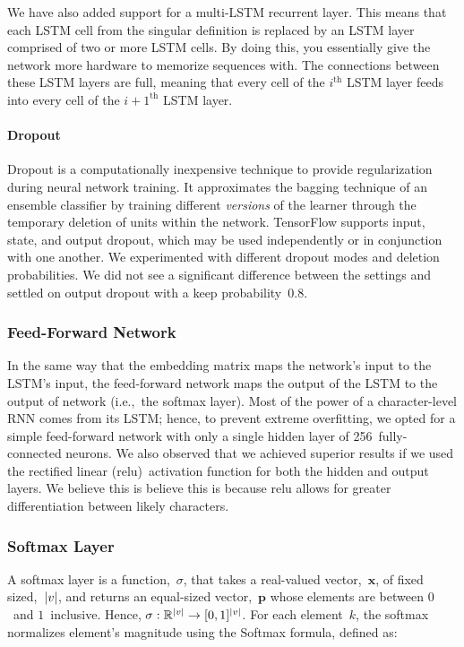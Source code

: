 \documentclass{article}
\DeclarePairedDelimiter\abs{\lvert}{\rvert}%
\begin{document}
We have also added support for a multi-LSTM recurrent layer. This means that each LSTM cell from the singular definition is replaced by an LSTM layer comprised of two or more LSTM cells. By doing this, you essentially give the network more hardware to memorize sequences with. The connections between these LSTM layers are full, meaning that every cell of the $i^{\text{th}}$ LSTM layer feeds into every cell of the $i+1^{\text{th}}$ LSTM layer.

\paragraph{Dropout}\label{sec:dropout}

Dropout is a computationally inexpensive technique to provide regularization during neural network training.  It approximates the bagging technique of an ensemble classifier by training different \textit{versions} of the learner through the temporary deletion of units within the network.\cite{goodfellow2016}  TensorFlow supports input, state, and output dropout, which may be used independently or in conjunction with one another.  We experimented with different dropout modes and deletion probabilities.  We did not see a significant difference between the settings and settled on output dropout with a keep probability~0.8.

\subsubsection{Feed-Forward Network}

In the same way that the embedding matrix maps the network's input to the LSTM's input, the feed-forward network maps the output of the LSTM to the output of network (i.e.,~the softmax layer).  Most of the power of a character-level RNN comes from its LSTM; hence, to prevent extreme overfitting, we opted for a simple feed-forward network with only a single hidden layer of 256~fully-connected neurons.   We also observed that we achieved superior results if we used the rectified linear (relu)~activation function for both the hidden and output layers.  We believe this is believe this is because relu allows for greater differentiation between likely characters.


\subsubsection{Softmax Layer}

A softmax layer is a function,~$\sigma$, that takes a real-valued vector,~$\mathbf{x}$, of fixed sized,~$\abs*{v}$, and returns an equal-sized vector,~$\mathbf{p}$ whose elements are between $0$~and $1$~inclusive.  Hence, $\sigma : \mathbb{R}^{\abs*{v}} \rightarrow [0,1]^{\abs*{v}}$. For each element~$k$, the softmax normalizes element's magnitude using the Softmax formula, defined as:
\end{document}
